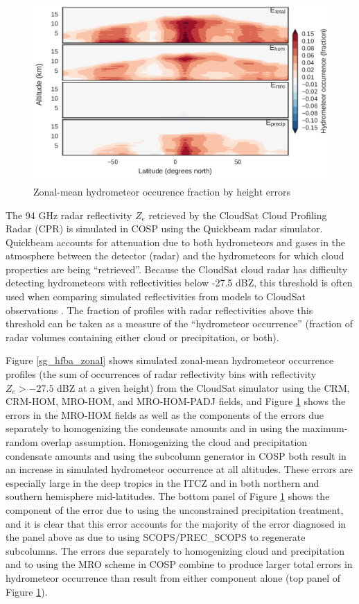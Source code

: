 \begin{figure}
\centering
\includegraphics[width=\columnwidth]{graphics/subgrid1_hfba_zonal_diff.pdf}
\caption{Zonal-mean hydrometeor occurence fraction by height errors}
\label{sg_hfba_zonal_diff}
\end{figure}

The 94 GHz radar reflectivity $Z_e$ retrieved by the CloudSat Cloud Profiling Radar (CPR) is simulated in COSP using the Quickbeam \citep{haynes_et_al_2007} radar simulator. Quickbeam accounts for attenuation due to both hydrometeors and gases in the atmosphere between the detector (radar) and the hydrometeors for which cloud properties are being ``retrieved''. Because the CloudSat cloud radar has difficulty detecting hydrometeors with reflectivities below -27.5 dBZ, this threshold is often used when comparing simulated reflectivities from models to CloudSat observations \citep{marchand_et_al_2009}. The fraction of profiles with radar reflectivities above this threshold can be taken as a measure of the ``hydrometeor occurrence'' (fraction of radar volumes containing either cloud or precipitation, or both). 

Figure \ref{sg_hfba_zonal} shows simulated zonal-mean hydrometeor occurrence profiles (the sum of occurrences of radar reflectivity bins with reflectivity  $Z_e > -27.5$ dBZ at a given height) from the CloudSat simulator using the CRM, CRM-HOM, MRO-HOM, and MRO-HOM-PADJ fields, and Figure \ref{sg_hfba_zonal_diff} shows the errors in the MRO-HOM fields as well as the components of the errors due separately to homogenizing the condensate amounts and in using the maximum-random overlap assumption. Homogenizing the cloud and precipitation condensate amounts and using the subcolumn generator in COSP both result in an increase in simulated hydrometeor occurrence at all altitudes. These errors are especially large in the deep tropics in the ITCZ and in both northern and southern hemisphere mid-latitudes. The bottom panel of Figure \ref{sg_hfba_zonal_diff} shows the component of the error due to using the unconstrained precipitation treatment, and it is clear that this error accounts for the majority of the error diagnosed in the panel above as due to using SCOPS/PREC\_SCOPS to regenerate subcolumns. The errors due separately to homogenizing cloud and precipitation and to using the MRO scheme in COSP combine to produce larger total errors in hydrometeor occurrence than result from either component alone (top panel of Figure \ref{sg_hfba_zonal_diff}). 

